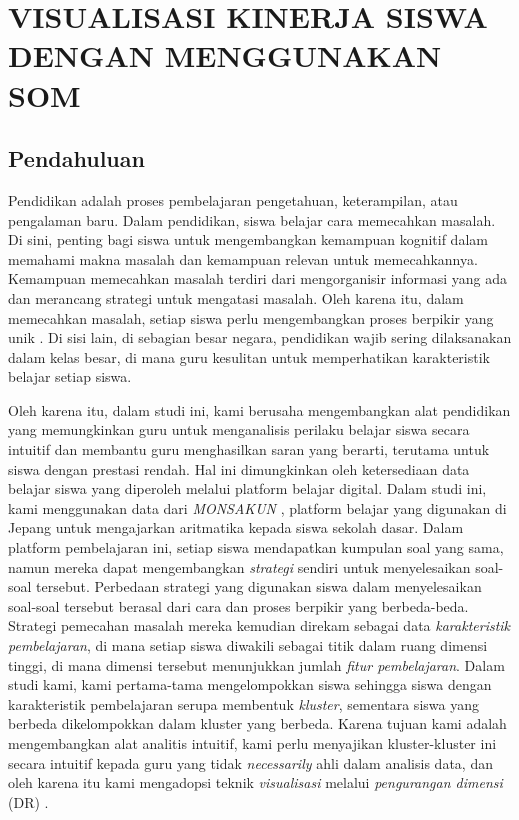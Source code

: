 \chapter{VISUALISASI KINERJA SISWA DENGAN MENGGUNAKAN SOM}

\section{Pendahuluan}

    Pendidikan adalah proses pembelajaran pengetahuan, keterampilan, atau pengalaman baru. Dalam pendidikan, siswa belajar cara memecahkan masalah. Di sini, penting bagi siswa untuk mengembangkan kemampuan kognitif dalam memahami makna masalah dan kemampuan relevan untuk memecahkannya. Kemampuan memecahkan masalah terdiri dari mengorganisir informasi yang ada dan merancang strategi untuk mengatasi masalah. Oleh karena itu, dalam memecahkan masalah, setiap siswa perlu mengembangkan proses berpikir yang unik \citep{Pamitah2015}. Di sisi lain, di sebagian besar negara, pendidikan wajib sering dilaksanakan dalam kelas besar, di mana guru kesulitan untuk memperhatikan karakteristik belajar setiap siswa.
    
    Oleh karena itu, dalam studi ini, kami berusaha mengembangkan alat pendidikan yang memungkinkan guru untuk menganalisis perilaku belajar siswa secara intuitif dan membantu guru menghasilkan saran yang berarti, terutama untuk siswa dengan prestasi rendah. Hal ini dimungkinkan oleh ketersediaan data belajar siswa yang diperoleh melalui platform belajar digital. Dalam studi ini, kami menggunakan data dari \textit{MONSAKUN} \citep{Supianto2016}, platform belajar yang digunakan di Jepang untuk mengajarkan aritmatika kepada siswa sekolah dasar. Dalam platform pembelajaran ini, setiap siswa mendapatkan kumpulan soal yang sama, namun mereka dapat mengembangkan \textit{strategi} sendiri untuk menyelesaikan soal-soal tersebut. Perbedaan strategi yang digunakan siswa dalam menyelesaikan soal-soal tersebut berasal dari cara dan proses berpikir yang berbeda-beda. Strategi pemecahan masalah mereka kemudian direkam sebagai data \textit{karakteristik pembelajaran}, di mana setiap siswa diwakili sebagai titik dalam ruang dimensi tinggi, di mana dimensi tersebut menunjukkan jumlah \textit{fitur pembelajaran}. Dalam studi kami, kami pertama-tama mengelompokkan siswa sehingga siswa dengan karakteristik pembelajaran serupa membentuk \textit{kluster}, sementara siswa yang berbeda dikelompokkan dalam kluster yang berbeda. Karena tujuan kami adalah mengembangkan alat analitis intuitif, kami perlu menyajikan kluster-kluster ini secara intuitif kepada guru yang tidak \textit{necessarily} ahli dalam analisis data, dan oleh karena itu kami mengadopsi teknik \textit{visualisasi} melalui \textit{pengurangan dimensi} (DR) \citep{Kreuseler2002a}.
    
